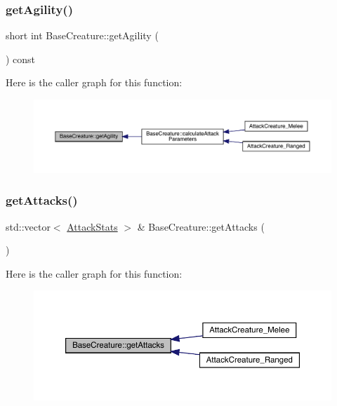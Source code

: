 \subsubsection{\texorpdfstring{get\+Agility()}{getAgility()}}
{\footnotesize\ttfamily short int Base\+Creature\+::get\+Agility (\begin{DoxyParamCaption}{ }\end{DoxyParamCaption}) const}

Here is the caller graph for this function\+:
\nopagebreak
\begin{figure}[H]
\begin{center}
\leavevmode
\includegraphics[width=350pt]{class_base_creature_ac04efe1dda147e264998609635baadb6_icgraph}
\end{center}
\end{figure}
\mbox{\label{class_base_creature_ae2fdab903403a68e431baa080f715d3c}} 
\subsubsection{\texorpdfstring{get\+Attacks()}{getAttacks()}}
{\footnotesize\ttfamily std\+::vector$<$ \mbox{\hyperlink{struct_attack_stats}{Attack\+Stats}} $>$ \& Base\+Creature\+::get\+Attacks (\begin{DoxyParamCaption}{ }\end{DoxyParamCaption})}

Here is the caller graph for this function\+:
\nopagebreak
\begin{figure}[H]
\begin{center}
\leavevmode
\includegraphics[width=350pt]{class_base_creature_ae2fdab903403a68e431baa080f715d3c_icgraph}
\end{center}
\end{figure}
\mbox{\label{class_base_creature_a4e3864bd12e271718a838ba6c3881f0a}} 
